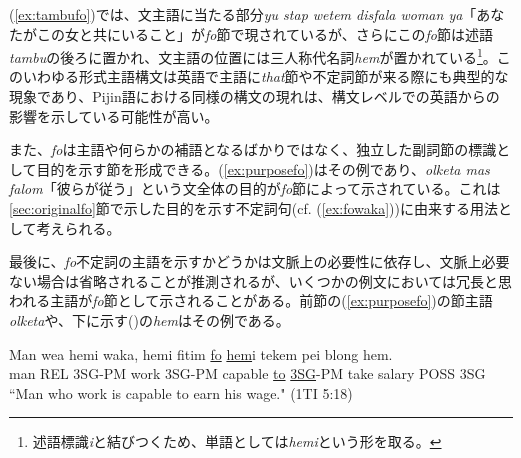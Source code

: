 (\ref{ex:tambufo})では、文主語に当たる部分\textit{yu stap wetem disfala woman ya}「あなたがこの女と共にいること」が\textit{fo}節で現されているが、さらにこの\textit{fo}節は述語\textit{tambu}の後ろに置かれ、文主語の位置には三人称代名詞\textit{hem}が置かれている\footnote{述語標識\textit{i}と結びつくため、単語としては\textit{hemi}という形を取る。}。このいわゆる形式主語構文は英語で主語に\textit{that}節や不定詞節が来る際にも典型的な現象であり\citep[1049, 1391--1392]{english}、Pijin語における同様の構文の現れは、構文レベルでの英語からの影響を示している可能性が高い。

また、\textit{fo}は主語や何らかの補語となるばかりではなく、独立した副詞節の標識として目的を示す節を形成できる。(\ref{ex:purposefo})はその例であり、\textit{olketa mas falom}「彼らが従う」という文全体の目的が\textit{fo}節によって示されている。これは\ref{sec:originalfo}節で示した目的を示す不定詞句(cf. (\ref{ex:fowaka}))に由来する用法として考えられる。

最後に、\textit{fo}不定詞の主語を示すかどうかは文脈上の必要性に依存し、文脈上必要ない場合は省略されることが推測されるが、いくつかの例文においては冗長と思われる主語が\textit{fo}節として示されることがある。前節の(\ref{ex:purposefo})の節主語\textit{olketa}や、下に示す()の\textit{hem}はその例である。

\begin{exe}
  \ex
  \gll Man wea hemi waka, hemi fitim \underline{fo} \underline{hem}i tekem pei blong hem.\\
  man REL 3SG-PM work 3SG-PM capable \underline{to} \underline{3SG}-PM take salary POSS 3SG\\
  \glt ``Man who work is capable to earn his wage." (1TI 5:18)
\end{exe}
